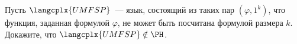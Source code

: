Пусть $\langcplx{UMFSP}$~--- язык, состоящий из таких пар $(\varphi, 1^k)$, что функция, заданная
формулой $\varphi$, не может быть посчитана формулой размера $k$. Докажите, что $\langcplx{UMFSP} \notin
\PH$.